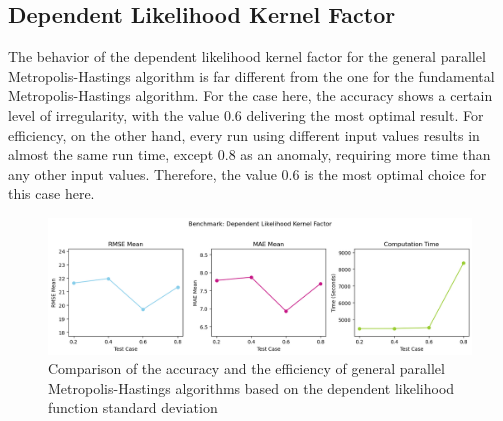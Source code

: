 \subsection{Dependent Likelihood Kernel Factor}
The behavior of the dependent likelihood kernel factor for the general parallel Metropolis-Hastings algorithm is far different from the one for the fundamental Metropolis-Hastings algorithm. For the case here, the accuracy shows a certain level of irregularity, with the value $0.6$ delivering the most optimal result. For efficiency, on the other hand, every run using different input values results in almost the same run time, except $0.8$ as an anomaly, requiring more time than any other input values. Therefore, the value $0.6$ is the most optimal choice for this case here.

\begin{figure}[H]
    \centering
    \includegraphics[width=1\textwidth]{figures/gpmh/dependent_likelihood_kernel_factor.png}
    \captionsetup{width=.8\textwidth}
    \caption{Comparison of the accuracy and the efficiency of general parallel Metropolis-Hastings algorithms based on the dependent likelihood function standard deviation}
    \label{fig:enter-label}
\end{figure}



